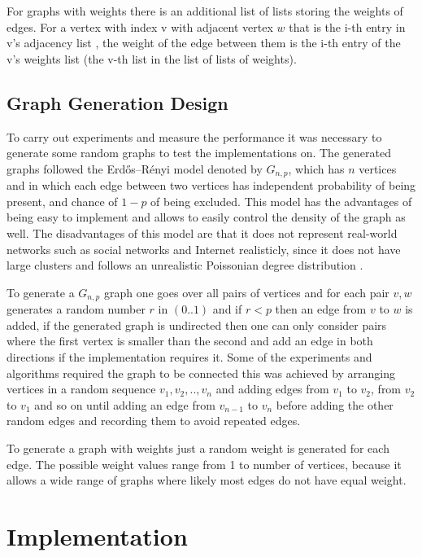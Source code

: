 \documentclass{report}
\theoremstyle{plain}
\theoremstyle{definition}
\theoremstyle{remark}
\begin{document}
For graphs with weights there is an additional list of lists storing the weights of edges. For a vertex with index v with adjacent vertex $w$ that is the i-th entry in v's adjacency list , the weight of the edge between them is the i-th entry of the v's weights list (the v-th list in the list of lists of weights).

\subsection{Graph Generation Design}

To carry out experiments and measure the performance it was necessary to generate some random graphs to test the implementations on. The generated graphs followed the Erdős–Rényi model denoted by $G_{n,p}$, which has $n$ vertices and in which each edge between two vertices has independent probability of being present, and chance of $1-p$ of being excluded. This model has the advantages of being easy to implement and allows to easily control the density of the graph as well. The disadvantages of this model are that it does not represent real-world networks such as social networks and Internet realisticly, since it does not have large clusters and follows an unrealistic Poissonian degree distribution \cite{newman20062}.

To generate a $G_{n,p}$ graph one goes over all pairs of vertices and for each pair $v,w$ generates a random number $r$ in $(0..1)$ and if $r < p$ then an edge from $v$ to $w$ is added, if the generated graph is undirected then one can only consider pairs where the first vertex is smaller than the second and add an edge in both directions if the implementation requires it. Some of the experiments and algorithms required the graph to be connected this was achieved by arranging vertices in a random sequence $v_1,v_2,..,v_n$ and adding edges from $v_1$ to $v_2$, from $v_2$ to $v_1$ and so on until adding an edge from $v_{n-1}$ to $v_n$  before adding the other random edges and recording them to avoid repeated edges.

To generate a graph with weights just a random weight is generated for each edge. The possible weight values range from 1 to number of vertices, because it allows a wide range of graphs where likely most edges do not have equal weight.

\section{Implementation}
\end{document}
